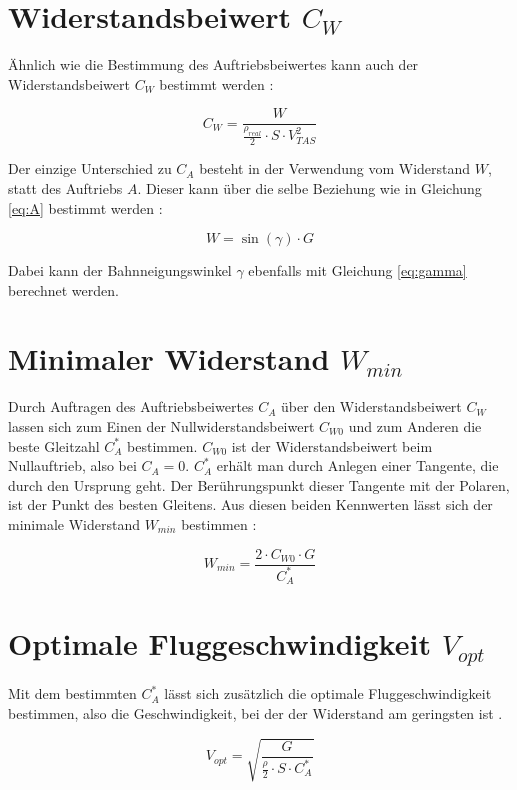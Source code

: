 \section{Widerstandsbeiwert $C_W$}

Ähnlich wie die Bestimmung des Auftriebsbeiwertes kann auch der Widerstandsbeiwert $C_W$ bestimmt werden \cite{Skript}:

\begin{equation}
C_W=\frac{W}{\frac{\rho_{real}}{2} \cdot S \cdot V_{TAS}^2}
\end{equation}

Der einzige Unterschied zu $C_A$ besteht in der Verwendung vom Widerstand $W$, statt des Auftriebs $A$. Dieser kann über die selbe Beziehung wie in Gleichung \ref{eq:A} bestimmt werden \cite{Skript}:

\begin{equation}
W=\sin(\gamma) \cdot G
\end{equation}

Dabei kann der Bahnneigungswinkel $\gamma$ ebenfalls mit Gleichung \ref{eq:gamma} berechnet werden.

\section{Minimaler Widerstand $W_{min}$}

Durch Auftragen des Auftriebsbeiwertes $C_A$ über den Widerstandsbeiwert $C_W$ lassen sich zum Einen der Nullwiderstandsbeiwert $C_{W0}$ und zum Anderen die beste Gleitzahl $C_A^*$ bestimmen. $C_{W0}$ ist der Widerstandsbeiwert beim Nullauftrieb, also bei $C_A=0$. $C_A^*$ erhält man durch Anlegen einer Tangente, die durch den Ursprung geht. Der Berührungspunkt dieser Tangente mit der Polaren, ist der Punkt des besten Gleitens. Aus diesen beiden Kennwerten lässt sich der minimale Widerstand $W_{min}$ bestimmen \cite{Skript}:

\begin{equation}
W_{min}=\frac{2 \cdot C_{W0} \cdot G}{C_A^*}
\label{eq:W_min}
\end{equation}

\section{Optimale Fluggeschwindigkeit $V_{opt}$}

Mit dem bestimmten $C_A^*$ lässt sich zusätzlich die optimale Fluggeschwindigkeit bestimmen, also die Geschwindigkeit, bei der der Widerstand am geringsten ist \cite{Skript}.

\begin{equation}
V_{opt}=\sqrt{\frac{G}{\frac{\rho}{2} \cdot S \cdot C_A^*}}
\label{eq:V_opt}
\end{equation}



